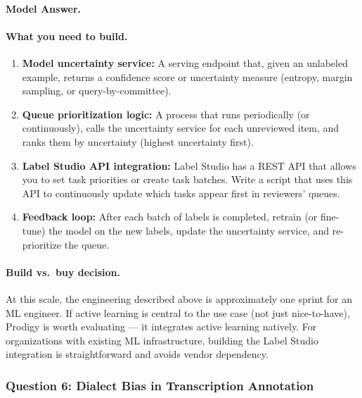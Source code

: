 \paragraph{Model Answer.}

\paragraph{What you need to build.}

\begin{enumerate}
    \item \textbf{Model uncertainty service:} A serving endpoint that, given an unlabeled example, returns a confidence score or uncertainty measure (entropy, margin sampling, or query-by-committee).

    \item \textbf{Queue prioritization logic:} A process that runs periodically (or continuously), calls the uncertainty service for each unreviewed item, and ranks them by uncertainty (highest uncertainty first).

    \item \textbf{Label Studio API integration:} Label Studio has a REST API that allows you to set task priorities or create task batches. Write a script that uses this API to continuously update which tasks appear first in reviewers' queues.

    \item \textbf{Feedback loop:} After each batch of labels is completed, retrain (or fine-tune) the model on the new labels, update the uncertainty service, and re-prioritize the queue.
\end{enumerate}

\paragraph{Build vs.\ buy decision.}

At this scale, the engineering described above is approximately one sprint for an ML engineer. If active learning is central to the use case (not just nice-to-have), Prodigy is worth evaluating --- it integrates active learning natively. For organizations with existing ML infrastructure, building the Label Studio integration is straightforward and avoids vendor dependency.

\subsubsection{Question 6: Dialect Bias in Transcription Annotation}

